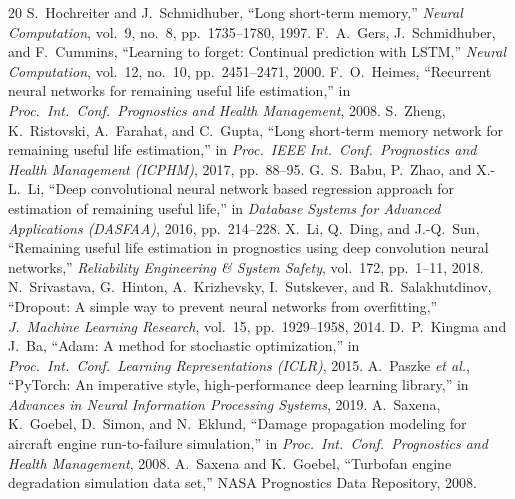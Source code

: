 \documentclass[conference]{IEEEtran}
\begin{document}
\begin{thebibliography}{20}
 S.~Hochreiter and J.~Schmidhuber, ``Long short-term memory,'' \emph{Neural Computation}, vol.~9, no.~8, pp.~1735--1780, 1997.
 F.~A.~Gers, J.~Schmidhuber, and F.~Cummins, ``Learning to forget: Continual prediction with LSTM,'' \emph{Neural Computation}, vol.~12, no.~10, pp.~2451--2471, 2000.
 F.~O.~Heimes, ``Recurrent neural networks for remaining useful life estimation,'' in \emph{Proc.\ Int.\ Conf.\ Prognostics and Health Management}, 2008.
 S.~Zheng, K.~Ristovski, A.~Farahat, and C.~Gupta, ``Long short-term memory network for remaining useful life estimation,'' in \emph{Proc.\ IEEE Int.\ Conf.\ Prognostics and Health Management (ICPHM)}, 2017, pp.~88--95.
 G.~S.~Babu, P.~Zhao, and X.-L.~Li, ``Deep convolutional neural network based regression approach for estimation of remaining useful life,'' in \emph{Database Systems for Advanced Applications (DASFAA)}, 2016, pp.~214--228.
 X.~Li, Q.~Ding, and J.-Q.~Sun, ``Remaining useful life estimation in prognostics using deep convolution neural networks,'' \emph{Reliability Engineering \& System Safety}, vol.~172, pp.~1--11, 2018.
 N.~Srivastava, G.~Hinton, A.~Krizhevsky, I.~Sutskever, and R.~Salakhutdinov, ``Dropout: A simple way to prevent neural networks from overfitting,'' \emph{J.\ Machine Learning Research}, vol.~15, pp.~1929--1958, 2014.
 D.~P.~Kingma and J.~Ba, ``Adam: A method for stochastic optimization,'' in \emph{Proc.\ Int.\ Conf.\ Learning Representations (ICLR)}, 2015.
 A.~Paszke \emph{et al.}, ``PyTorch: An imperative style, high-performance deep learning library,'' in \emph{Advances in Neural Information Processing Systems}, 2019.
 A.~Saxena, K.~Goebel, D.~Simon, and N.~Eklund, ``Damage propagation modeling for aircraft engine run-to-failure simulation,'' in \emph{Proc.\ Int.\ Conf.\ Prognostics and Health Management}, 2008.
 A.~Saxena and K.~Goebel, ``Turbofan engine degradation simulation data set,'' NASA Prognostics Data Repository, 2008.
\end{thebibliography}
\end{document}
